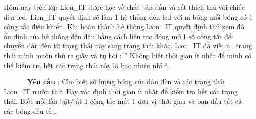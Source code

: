 Hôm nay trên lớp Lion\_IT được học về chất bán dẫn và rất thích thú với chiếc đèn led. Lion\_IT quyết định sẽ làm 1 hệ thống đèn led với m bóng mỗi bóng có 1 công tắc điều khiển. Khi hoàn thành hệ thống Lion\_IT quyết định thử xem độ ổn định của hệ thống đến đâu bằng cách liên tục đóng mở 1 số công tắt để chuyển dàn đèn từ trạng thái này sang trạng thái khác. Lion\_IT đã viết n  trạng thái mình muốn thử ra giấy và tự hỏi : ” Không biết thời gian ít nhất để mình có thể kiểm tra hết các trạng thái này là bao nhiêu nhỉ “.

       \textbf{Yêu cầu} : Cho biết số lượng bóng của dàn đèn và các trạng thái Lion\_IT muốn thử. Hãy xác định thời gian ít nhất để kiểm tra hết các trạng thái. Biết mỗi lần bật/tắt 1 công tắc mất 1 đơn vị thời gian và ban đầu tất cả các bóng đều tắt.